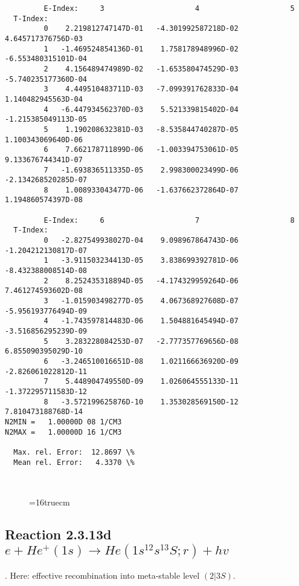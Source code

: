 \documentclass[12pt,dvipdfmx]{article}
\begin{document}
{\begin{small}
\begin{verbatim}
         E-Index:     3                     4                     5
  T-Index:
         0    2.219812747147D-01   -4.301992587218D-02    4.645717376756D-03
         1   -1.469524854136D-01    1.758178948996D-02   -6.553480315101D-04
         2    4.156489474989D-02   -1.653580474529D-03   -5.740235177360D-04
         3    4.449510483711D-03   -7.099391762833D-04    1.140482945563D-04
         4   -6.447934562370D-03    5.521339815402D-04   -1.215385049113D-05
         5    1.190208632381D-03   -8.535844740287D-05    1.100343069640D-06
         6    7.662178711899D-06   -1.003394753061D-05    9.133676744341D-07
         7   -1.693836511335D-05    2.998300023499D-06   -2.134268520285D-07
         8    1.008933043477D-06   -1.637662372864D-07    1.194860574397D-08

         E-Index:     6                     7                     8
  T-Index:
         0   -2.827549938027D-04    9.098967864743D-06   -1.204212130817D-07
         1   -3.911503234413D-05    3.838699392781D-06   -8.432388008514D-08
         2    8.252435318894D-05   -4.174329959264D-06    7.461274593602D-08
         3   -1.015903498277D-05    4.067368927608D-07   -5.956193776494D-09
         4   -1.743597814483D-06    1.504881645494D-07   -3.516856295239D-09
         5    3.283228084253D-07   -2.777357769656D-08    6.855090395029D-10
         6   -3.246510016651D-08    1.021166636920D-09   -2.826061022812D-11
         7    5.448904749550D-09    1.026064555133D-11   -1.372295711583D-12
         8   -3.572199625876D-10    1.353028569150D-12    7.810473188768D-14
N2MIN =   1.00000D 08 1/CM3
N2MAX =   1.00000D 16 1/CM3

  Max. rel. Error:  12.8697 \%
  Mean rel. Error:   4.3370 \%



\end{verbatim}\end{small}
\begin{figure} \label{2.3.13c}
\epsfxsize=16truecm
\end{figure}
\newpage

\subsection{
Reaction 2.3.13d  $e + He^+(1s) \rightarrow He(1s^12s^13S;r) + hv $ }
\cite{kn:Fujimoto}. Here: effective recombination into meta-stable
level $(2|3S)$.

}
\end{document}
